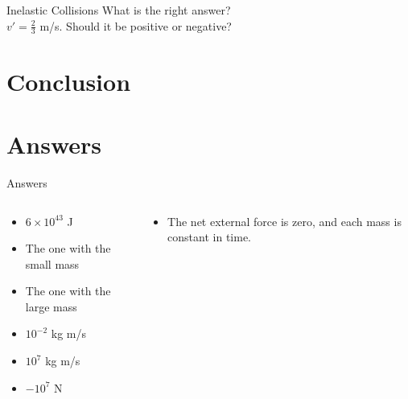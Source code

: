 \documentclass{beamer}
\begin{document}
\begin{frame}{Inelastic Collisions}
What is the right answer? \\ \vspace{0.5cm}
$v' = \frac{2}{3}$ m/s.  Should it be positive or negative?
\end{frame}

\section{Conclusion}

\section{Answers}

\begin{frame}{Answers}
\small
\begin{columns}[T]
\begin{column}{0.5\textwidth}
\begin{itemize}
\item $6\times 10^{43}$ J
\item The one with the small mass
\item The one with the large mass
\item $10^{-2}$ kg m/s
\item $10^{7}$ kg m/s
\item $-10^{7}$ N
\end{itemize}
\end{column}
\begin{column}{0.5\textwidth}
\begin{itemize}
\item The net external force is zero, and each mass is constant in time.
\end{itemize}
\end{column}
\end{columns}
\end{frame}
\end{document}
